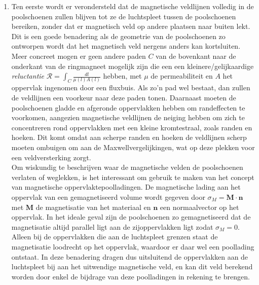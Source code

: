 \documentclass[we,twoside,openright,a4paper,11pt]{uantwerpenbamathesis}
\begin{document}
\begin{enumerate}
    \item Ten eerste wordt er verondersteld dat de magnetische veldlijnen volledig in de poolschoenen zullen blijven tot ze de luchtspleet tussen de poolschoenen bereiken, zonder dat er magnetisch veld op andere plaatsen naar buiten lekt. Dit is een goede benadering als de geometrie van de poolschoenen zo ontworpen wordt dat het magnetisch veld nergens anders kan kortsluiten. Meer concreet mogen er geen andere paden $C$ van de bovenkant naar de onderkant van de ringmagneet mogelijk zijn die een een kleinere/gelijkaardige \textit{reluctantie} $\mathcal{R}=\int_C\frac{dl}{\mu(l)A(l)}$ hebben, met $\mu$ de permeabiliteit en $A$ het oppervlak ingenomen door een fluxbuis. Als zo'n pad wel bestaat, dan zullen de veldlijnen een voorkeur naar deze paden tonen. Daarnaast moeten de poolschoenen gladde en afgeronde oppervlakken hebben om randeffecten te voorkomen, aangezien magnetische veldlijnen de neiging hebben om zich te concentreren rond oppervlakken met een kleine kromtestraal, zoals randen en hoeken. Dit komt omdat aan scherpe randen en hoeken de veldlijnen scherp moeten ombuigen om aan de Maxwellvergelijkingen, wat op deze plekken voor een veldversterking zorgt.\\

    Om wiskundig te beschrijven waar de magnetische velden de poolschoenen verlaten of weglekken, is het interessant om gebruik te maken van het concept van magnetische oppervlaktepoolladingen. De magnetische lading aan het oppervlak van een gemagnetiseerd volume wordt gegeven door $\sigma_M=\mathbf{M}\cdot\mathbf{n}$ met $\mathbf{M}$ de magnetisatie van het materiaal en $\mathbf{n}$ een normaalvector op het oppervlak. In het ideale geval zijn de poolschoenen zo gemagnetiseerd dat de magnetisatie altijd parallel ligt aan de zijoppervlakken ligt zodat $\sigma_M=0$. Alleen bij de oppervlakken die aan de luchtspleet grenzen staat de magnetisatie loodrecht op het oppervlak, waardoor er daar wel een poollading ontstaat. In deze benadering dragen dus uitsluitend de oppervlakken aan de luchtspleet bij aan het uitwendige magnetische veld, en kan dit veld berekend worden door enkel de bijdrage van deze poolladingen in rekening te brengen.\\


\end{enumerate}
\end{document}
